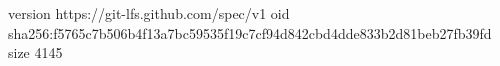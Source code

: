 version https://git-lfs.github.com/spec/v1
oid sha256:f5765c7b506b4f13a7bc59535f19c7cf94d842cbd4dde833b2d81beb27fb39fd
size 4145
